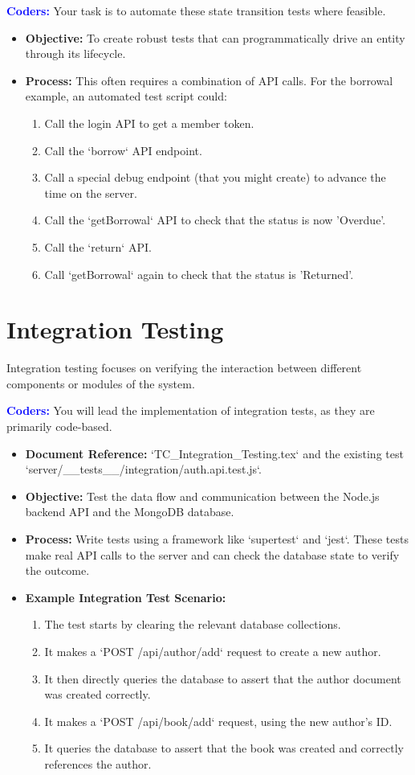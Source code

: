\documentclass{article}
\newcommand{\role}[1]{\textbf{\textcolor{blue}{#1:}}}
\begin{document}
\role{Coders}
Your task is to automate these state transition tests where feasible.
\begin{itemize}
    \item \textbf{Objective:} To create robust tests that can programmatically drive an entity through its lifecycle.
    \item \textbf{Process:} This often requires a combination of API calls. For the borrowal example, an automated test script could:
    \begin{enumerate}
        \item Call the login API to get a member token.
        \item Call the `borrow` API endpoint.
        \item Call a special debug endpoint (that you might create) to advance the time on the server.
        \item Call the `getBorrowal` API to check that the status is now 'Overdue'.
        \item Call the `return` API.
        \item Call `getBorrowal` again to check that the status is 'Returned'.
    \end{enumerate}
\end{itemize}


\section{Integration Testing}
Integration testing focuses on verifying the interaction between different components or modules of the system.

\role{Coders}
You will lead the implementation of integration tests, as they are primarily code-based.
\begin{itemize}
    \item \textbf{Document Reference:} `TC\_Integration\_Testing.tex` and the existing test `server/\_\_tests\_\_/integration/auth.api.test.js`.
    \item \textbf{Objective:} Test the data flow and communication between the Node.js backend API and the MongoDB database.
    \item \textbf{Process:} Write tests using a framework like `supertest` and `jest`. These tests make real API calls to the server and can check the database state to verify the outcome.
    \item \textbf{Example Integration Test Scenario:}
    \begin{enumerate}
        \item The test starts by clearing the relevant database collections.
        \item It makes a `POST /api/author/add` request to create a new author.
        \item It then directly queries the database to assert that the author document was created correctly.
        \item It makes a `POST /api/book/add` request, using the new author's ID.
        \item It queries the database to assert that the book was created and correctly references the author.
    \end{enumerate}
\end{itemize}
\end{document}
